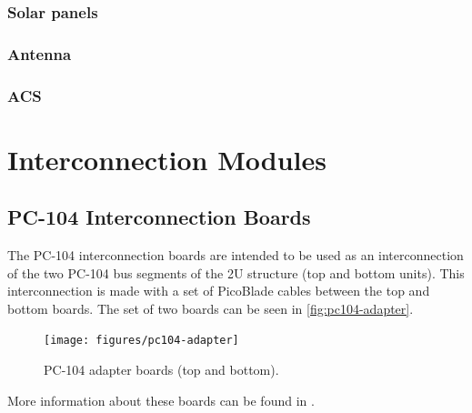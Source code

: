 

\subsubsection{Solar panels}


\subsubsection{Antenna}

\subsubsection{ACS}


\section{Interconnection Modules}

\subsection{PC-104 Interconnection Boards}

The PC-104 interconnection boards are intended to be used as an interconnection of the two PC-104 bus segments of the 2U structure (top and bottom units). This interconnection is made with a set of PicoBlade cables between the top and bottom boards. The set of two boards can be seen in \autoref{fig:pc104-adapter}.

\begin{figure}[!ht]
    \begin{center}
        \texttt{[image: figures/pc104-adapter]}
        \caption{PC-104 adapter boards (top and bottom).}
        \label{fig:pc104-adapter}
    \end{center}
\end{figure}

More information about these boards can be found in \cite{pc104-boards}.

